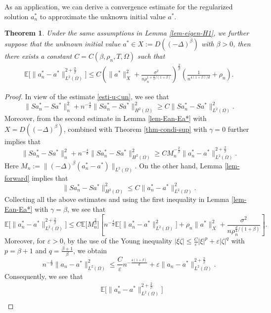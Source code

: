 \documentclass[11pt]{article}
\newtheorem{theorem}{Theorem}
\numberwithin{equation}{section}
\begin{document}
As an application, we can derive a convergence estimate for the regularized solution $ a_n^* $ to approximate the unknown initial value $ a^* $.
\begin{theorem}\label{thm-E-condi}
Under the same assumptions in Lemma \ref{lem-eigen-H1}, we further suppose that the unknown initial value $a^*\in X:=D((-\Delta)^\beta)$ with $\beta>0$, then there exists a constant $C=C(\beta,\rho_n,T,\Omega)$ such that
\[
\begin{aligned}
\mathbb{E} \bigl[ \| a_n^* - a^* \|^{2+\frac{2}{\beta}}_{L^2(\Omega)} \bigr]
\le  C\left( \| a^* \|^2_{X} + \frac{\sigma^2}{n \rho_n^{1 + \frac{d}4/(1+\beta)}}\right)^{\frac2\beta} \left( \frac1{n^{4(1+\beta)/d}} +\rho_n \right).
\end{aligned}
\]
\end{theorem}
\begin{proof}
In view of the estimate \eqref{esti-u<un}, we see that
\[
 \| S a_n^* - S a^* \|^2_n  + n^{-\frac4d}  \| S a_n^* - S a^* \|^2_{H^2(\Omega)}  \geq C  \| S a_n^* - S a^* \|^2_{L^2(\Omega)}.
\]
Moreover, from the second estimate in Lemma \ref{lem-Ean-Ea*} with $X=D((-\Delta)^{\beta})$, combined with Theorem \ref{thm-condi-sup} with $\gamma=0$ further implies that
\[
 \| S a_n^* - S a^* \|^2_n  + n^{-\frac4d} \| S a_n^* - S a^* \|^2_{H^2(\Omega)}  \geq C  M_n^{-\frac{2}{\beta}}\| a_n^* - a^* \|^{2+\frac{2}{\beta}}_{L^2(\Omega)} .
\]
Here $M_n:= \|(-\Delta)^\beta (a_n^* - a^*)\|_{L^2(\Omega)}$. On the other hand, Lemma \ref{lem-forward} implies that
\[
 \| S a_n^* - S a^* \|^2_{H^2(\Omega)} \leq C \|a_n^* - a^* \|^2_{L^2(\Omega)} .
\]
Collecting all the above estimates and using the first inequality in Lemma \ref{lem-Ean-Ea*} with $\gamma=\beta$, we see that
\[
\mathbb{E} \bigl[ \| a_n^* - a^* \|^{2+\frac{2}{\beta}}_{L^2(\Omega)} \bigr]\le C\mathbb{E} \bigl[M_n^{\frac2\beta} \bigr] \left[n^{-\frac4d}\mathbb{E} \bigl[\|a_n^* - a^* \|^2_{L^2(\Omega)} \bigr] +  \rho_n \| a^* \|^2_{X} +  \frac{\sigma^2}{n \rho_n^{\frac{d}{4}/(1+\beta)}} \right].
\]
Moreover, for $\varepsilon>0$, by the use of the Young inequality $|\xi\zeta| \le \frac{C}{\varepsilon} |\xi|^p + \varepsilon |\zeta|^q$ with $p=\beta+1$ and $q=\frac{\beta+1}{\beta}$, we obtain
\[
 n^{-\frac4d}\|a_n - a^* \|^2_{L^2(\Omega)}  \le \frac{C}{\varepsilon}n^{-\frac{4(1+\beta)}d} + \varepsilon \|a_n - a^* \|^{2+\frac2\beta}_{L^2(\Omega)}.
\]
Consequently, we see that
\[
\begin{aligned}
&\mathbb{E} \bigl[ \| a_n^* - a^* \|^{2+\frac{2}{\beta}}_{L^2(\Omega)} \bigr] \\

\end{aligned}\]
\end{proof}
\end{document}
